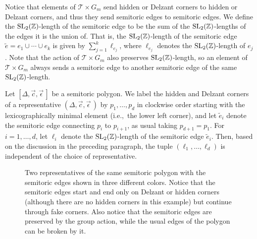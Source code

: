 \documentclass[10pt,a4paper]{amsart}
\numberwithin{equation}{section}
\def\Z{{\mathbb Z}}
\newcommand{\De}{\Delta}
\newcommand{\SL}{{\rm SL}_2(\Z)}
\newcommand{\stpoly}{[\De,\vec{c},\vec{\epsilon}\,]}
\newcommand{\strep}{(\De,\vec{c},\vec{\epsilon}\,)}
\theoremstyle{definition}
\theoremstyle{plain}
\theoremstyle{plain}
\begin{document}
Notice that elements of $\mathcal{T}\times G_m$ send hidden or Delzant corners to hidden or Delzant corners, and thus they send semitoric edges to semitoric edges.
We define the $\SL$-length of the semitoric edge to be the sum of the $\SL$-lengths of the edges it is the union of. That is, the $\SL$-length of the semitoric edge $\tilde{e} = e_1\cup \cdots \cup e_k$ is given by $\sum_{j=1}^k \ell_{e_j}$, where $\ell_{e_j}$ denotes the $\SL$-length of $e_j$.
Note that the action of $\mathcal{T}\times G_m$ also preserves $\SL$-length, so an element of $\mathcal{T}\times G_m$ always sends a semitoric edge to another semitoric edge of the same $\SL$-length.

Let $\stpoly$ be a semitoric polygon. We label the hidden and Delzant corners of a representative $\strep$ by $p_1,\ldots,p_d$ in clockwise order starting with the lexicographically minimal element (i.e.,~the lower left corner), and let $\tilde{e}_i$ denote the semitoric edge connecting $p_i$ to $p_{i+1}$, as usual taking $p_{d+1} = p_1$. For $i=1,\dots,d$, let $\ell_i$ denote the $\SL$-length of the semitoric edge $\tilde{e}_i$. Then, based on the discussion in the preceding paragraph, the tuple $(\ell_1,\ldots,\ell_d)$ is independent of the choice of representative.

 \begin{figure}[t]
 \centering
 \begin{subfigure}{.45\linewidth}
 \centering
 \caption{}
 \label{fig:st-edges-a}
 \end{subfigure}
 \begin{subfigure}{.45\linewidth}
 \centering
 \caption{}
 \label{fig:st-edges-b}
 \end{subfigure}
 \caption{Two representatives of the same semitoric polygon with the semitoric edges shown in three different colors. Notice that the semitoric edges start and end only on Delzant or hidden corners (although there are no hidden corners in this example) but continue through fake corners. Also notice that the semitoric edges are preserved by the group action, while the usual edges of the polygon can be broken by it.}
 \label{fig:st-edges}
 \end{figure}
\end{document}
